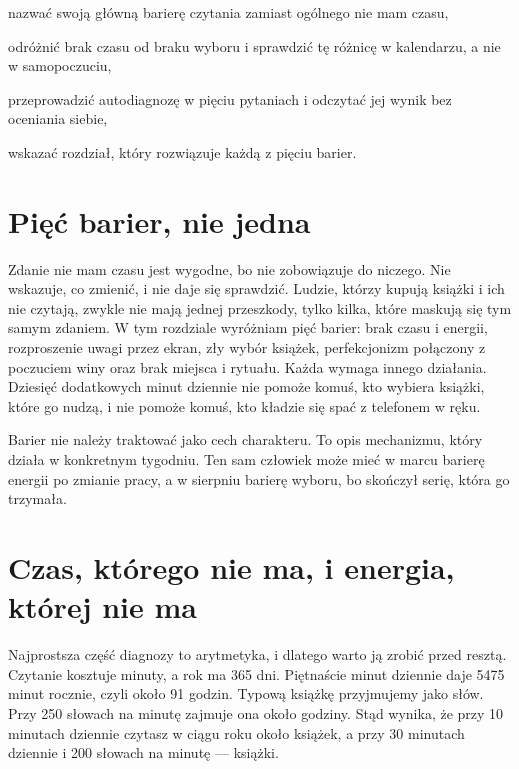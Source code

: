
\begin{cele}
\item nazwać swoją główną barierę czytania zamiast ogólnego \glqq nie mam czasu\grqq{},
\item odróżnić brak czasu od braku wyboru i sprawdzić tę różnicę w kalendarzu, a nie w samopoczuciu,
\item przeprowadzić autodiagnozę w pięciu pytaniach i odczytać jej wynik bez oceniania siebie,
\item wskazać rozdział, który rozwiązuje każdą z pięciu barier.
\end{cele}

\section{Pięć barier, nie jedna}

Zdanie \glqq nie mam czasu\grqq{} jest wygodne, bo nie zobowiązuje do niczego. Nie wskazuje, co zmienić, i nie daje się sprawdzić. Ludzie, którzy kupują książki i ich nie czytają, zwykle nie mają jednej przeszkody, tylko kilka, które maskują się tym samym zdaniem. W tym rozdziale wyróżniam pięć barier: brak czasu i energii, rozproszenie uwagi przez ekran, zły wybór książek, perfekcjonizm połączony z poczuciem winy oraz brak miejsca i rytuału. Każda wymaga innego działania. Dziesięć dodatkowych minut dziennie nie pomoże komuś, kto wybiera książki, które go nudzą, i nie pomoże komuś, kto kładzie się spać z telefonem w ręku.

Barier nie należy traktować jako cech charakteru. To opis mechanizmu, który działa w konkretnym tygodniu. Ten sam człowiek może mieć w marcu barierę energii po zmianie pracy, a w sierpniu barierę wyboru, bo skończył serię, która go trzymała.

\section{Czas, którego nie ma, i energia, której nie ma}

Najprostsza część diagnozy to arytmetyka, i dlatego warto ją zrobić przed resztą. Czytanie kosztuje minuty, a rok ma 365 dni. Piętnaście minut dziennie daje 5475 minut rocznie, czyli około 91 godzin. Typową książkę przyjmujemy jako  słów. Przy 250 słowach na minutę zajmuje ona około  godziny. Stąd wynika, że przy 10 minutach dziennie czytasz w ciągu roku około  książek, a przy 30 minutach dziennie i 200 słowach na minutę ---  książki.

